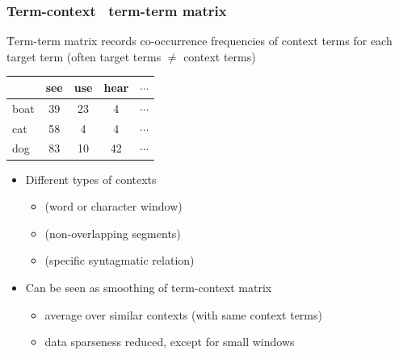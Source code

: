 \begin{frame}
  \frametitle{Term-context \vs\ term-term matrix}

  \h{Term-term matrix} records co-occurrence frequencies of context terms for each target term (often target terms $\neq$ context terms)
  \begin{center}
    \begin{tabular}{l|c|c|c|c}
      & see & use & hear & $\cdots$ \\
      \hline
      boat & 39 & 23 & 4 & $\cdots$ \\
      \hline
      cat  & 58 & 4 & 4 & $\cdots$ \\
      \hline
      dog  & 83 & 10 & 42 & $\cdots$ \\
      \hline
    \end{tabular}
  \end{center}
  
  \begin{itemize}
  \item<2-> Different types of contexts \citep{Evert:08}
    \begin{itemize}
    \item {} (word or character window)
    \item {} (non-overlapping segments)
    \item {} (specific syntagmatic relation)
    \end{itemize}
  \item<2-> Can be seen as smoothing of term-context matrix
    \begin{itemize}
    \item average over similar contexts (with same context terms)
    \item data sparseness reduced, except for small windows
    \end{itemize}
  \end{itemize}
\end{frame}

